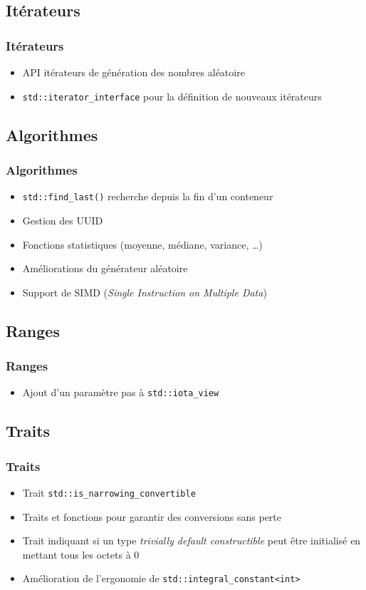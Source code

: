 \documentclass[C++.tex]{subfiles}
\begin{document}
\subsection*{Itérateurs}
\begin{frame}[fragile]
	\frametitle{Itérateurs}
	\begin{itemize}
		\item API \og itérateurs\fg{} de génération des nombres aléatoire
		\item \lstinline|std::iterator_interface| pour la définition de nouveaux itérateurs
	\end{itemize}
\end{frame}

\subsection*{Algorithmes}
\begin{frame}[fragile]
	\frametitle{Algorithmes}
	\begin{itemize}
		\item \lstinline|std::find_last()| recherche depuis la fin d'un conteneur
		\item Gestion des UUID
		\item Fonctions statistiques (moyenne, médiane, variance, \ldots{})
		\item Améliorations du générateur aléatoire
		\item Support de SIMD (\textit{Single Instruction on Multiple Data})
	\end{itemize}
\end{frame}

\subsection*{Ranges}
\begin{frame}[fragile]
	\frametitle{Ranges}
	\begin{itemize}
		\item Ajout d'un paramètre \og pas\fg{} à \lstinline|std::iota_view|
	\end{itemize}
\end{frame}

\subsection*{Traits}
\begin{frame}[fragile]
	\frametitle{Traits}
	\begin{itemize}
		\item Trait \lstinline|std::is_narrowing_convertible|
		\item Traits et fonctions pour garantir des conversions sans perte
		\item Trait indiquant si un type \textit{trivially default constructible} peut être initialisé en mettant tous les octets à 0
		\item Amélioration de l'ergonomie de \lstinline|std::integral_constant<int>|
	\end{itemize}
\end{frame}
\end{document}
